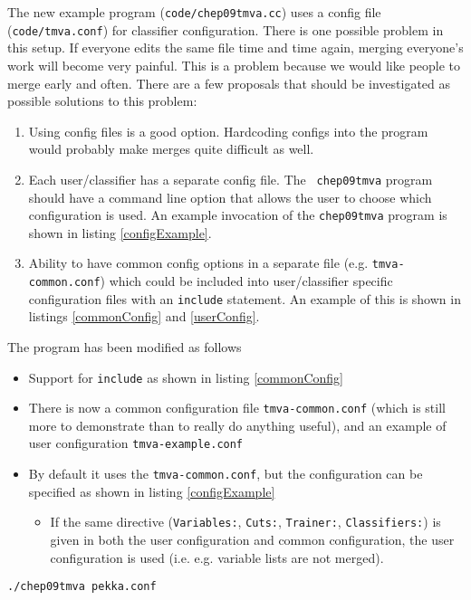 \begin{appendix}
The new example program ({\tt code/chep09tmva.cc}) uses a config file
({\tt code/tmva.conf}) for classifier configuration. There is one
possible problem in this setup. If everyone edits the same file time
and time again, merging everyone's work will become very painful. This
is a problem because we would like people to merge early and
often. There are a few proposals that should be investigated as
possible solutions to this problem:
\begin{enumerate}
\item Using config files is a good option. Hardcoding configs into
the program would probably make merges quite difficult as well.
\item Each user/classifier has a separate config file. The {\tt
chep09tmva} program should have a command line option that allows the
user to choose which configuration is used. An example invocation of
the {\tt chep09tmva} program is shown in listing \ref{configExample}.
\item Ability to have common config options in a separate file
(e.g. {\tt tmva-common.conf}) which could be included into
user/classifier specific configuration files with an {\tt include}
statement. An example of this is shown in listings \ref{commonConfig}
and \ref{userConfig}.
\end{enumerate}

The program has been modified as follows
\begin{itemize}
\item Support for \texttt{include} as shown in listing
  \ref{commonConfig}
\item There is now a common configuration file
  \texttt{tmva-common.conf} (which is still more to demonstrate than
  to really do anything useful), and an example of user configuration
  \texttt{tmva-example.conf}
\item By default it uses the \texttt{tmva-common.conf}, but the
  configuration can be specified as shown in listing \ref{configExample}
  \begin{itemize}
  \item If the same directive (\texttt{Variables:}, \texttt{Cuts:},
    \texttt{Trainer:}, \texttt{Classifiers:}) is given in both the
    user configuration and common configuration, the user
    configuration is used (i.e. e.g. variable lists are not merged).
  \end{itemize}
\end{itemize}



\begin{lstlisting}
./chep09tmva pekka.conf
\end{lstlisting}


\end{appendix}
